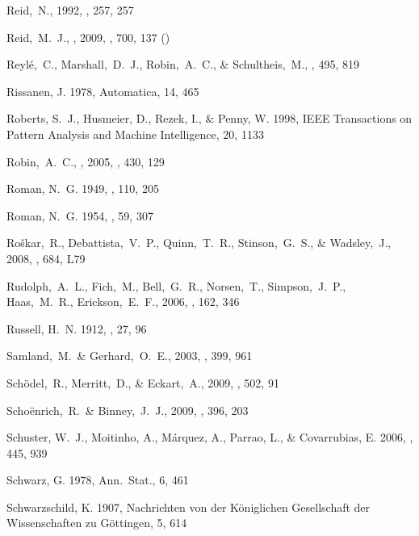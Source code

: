 \begin{thebibliography}{99}
  Reid,~N., 1992,
  \mnras, 257, 257

 Reid,~M.~J., \etal, 2009,
  \apj, 700, 137 (\reid)

  Reyl\'{e},~C., Marshall,~D.~J., Robin,~A.~C., \& Schultheis,~M., \aap, 495, 819

{Rissanen}, J. 1978, {Automatica}, 14, 465

{Roberts}, S.~J., {Husmeier}, D., {Rezek}, I., \& {Penny}, W. 1998, IEEE
  Transactions on Pattern Analysis and Machine Intelligence, 20, 1133

  Robin,~A.~C., \etal, 2005,
  \aap, 430, 129

{Roman}, N.~G. 1949, \apj, 110, 205

{Roman}, N.~G. 1954, \aj, 59, 307

  Ro{\v s}kar,~R., Debattista,~V.~P., Quinn,~T.~R., Stinson,~G.~S., \& Wadsley,~J., 2008,
  \apjl, 684, L79

  Rudolph,~A.~L., Fich,~M., Bell,~G.~R., Norsen,~T., Simpson,~J.~P., Haas,~M.~R., Erickson,~E.~F., 2006,
  \apjs, 162, 346

{Russell}, H.~N. 1912, \aj, 27, 96

  Samland,~M.~\& Gerhard,~O.~E., 2003,
  \aap, 399, 961

  Sch\"{o}del,~R., Merritt,~D., \& Eckart,~A., 2009, \aap, 502, 91

  Scho\"{e}nrich,~R.~\& Binney,~J.~J., 2009,
  \mnras, 396, 203

{Schuster}, W.~J., {Moitinho}, A., {M{\'a}rquez}, A., {Parrao}, L., \&
  {Covarrubias}, E. 2006, \aap, 445, 939

{Schwarz}, G. 1978, {Ann.~Stat.}, 6, 461

{Schwarzschild}, K. 1907, {Nachrichten von der K{\"o}niglichen Gesellschaft der
  Wissenschaften zu G{\"o}ttingen}, 5, {614}


\end{thebibliography}
